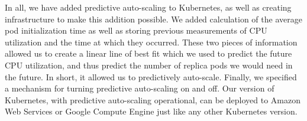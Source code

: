 In all, we have added predictive auto-scaling to Kubernetes, as well as
creating infrastructure to make this addition possible. We added calculation of
the average pod initialization time as well as storing previous measurements of
CPU utilization and the time at which they occurred. These two pieces of
information allowed us to create a linear line of best fit which we used to
predict the future CPU utilization, and thus predict the number of replica pods
we would need in the future. In short, it allowed us to predictively auto-scale.
Finally, we specified a mechanism for turning predictive auto-scaling on and
off. Our version of Kubernetes, with predictive auto-scaling operational, can be
deployed to Amazon Web Services or Google Compute Engine just like any other Kubernetes
version.
